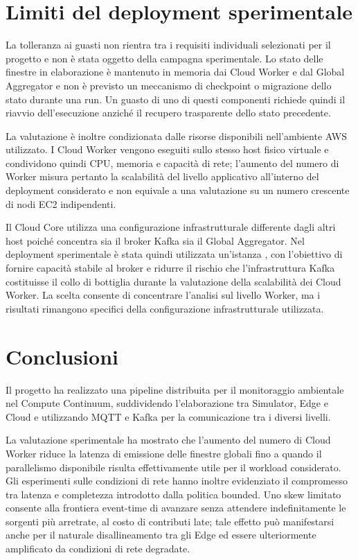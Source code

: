 \section{Limiti del deployment sperimentale}
\label{sec:limitazioni}

La tolleranza ai guasti non rientra tra i requisiti individuali selezionati
per il progetto e non è stata oggetto della campagna sperimentale. Lo stato
delle finestre in elaborazione è mantenuto in memoria dai Cloud Worker e dal
Global Aggregator e non è previsto un meccanismo di checkpoint o migrazione
dello stato durante una run. Un guasto di uno di questi componenti richiede
quindi il riavvio dell'esecuzione anziché il recupero trasparente dello stato
precedente.

La valutazione è inoltre condizionata dalle risorse disponibili
nell'ambiente AWS utilizzato. I Cloud Worker vengono eseguiti sullo stesso
host fisico virtuale e condividono quindi CPU, memoria e capacità di rete;
l'aumento del numero di Worker misura pertanto la scalabilità del livello
applicativo all'interno del deployment considerato e non equivale a una
valutazione su un numero crescente di nodi EC2 indipendenti.

Il Cloud Core utilizza una configurazione infrastrutturale differente dagli
altri host poiché concentra sia il broker Kafka sia il Global Aggregator.
Nel deployment sperimentale è stata quindi utilizzata un'istanza
, con l'obiettivo di fornire capacità stabile al broker e
ridurre il rischio che l'infrastruttura Kafka costituisse il collo di
bottiglia durante la valutazione della scalabilità dei Cloud Worker.
La scelta consente di concentrare l'analisi sul livello Worker, ma i risultati
rimangono specifici della configurazione infrastrutturale utilizzata.

\section{Conclusioni}
\label{sec:conclusioni}

Il progetto ha realizzato una pipeline distribuita per il monitoraggio
ambientale nel Compute Continuum, suddividendo l'elaborazione tra Simulator,
Edge e Cloud e utilizzando MQTT e Kafka per la comunicazione tra i diversi
livelli.

La valutazione sperimentale ha mostrato che l'aumento del numero di Cloud
Worker riduce la latenza di emissione delle finestre globali fino a quando il
parallelismo disponibile risulta effettivamente utile per il workload
considerato. Gli esperimenti sulle condizioni di rete hanno inoltre
evidenziato il compromesso tra latenza e completezza introdotto dalla politica
bounded. Uno skew limitato consente alla frontiera event-time di avanzare
senza attendere indefinitamente le sorgenti più arretrate, al costo di
contributi late; tale effetto può manifestarsi anche per il naturale
disallineamento tra gli Edge ed essere ulteriormente amplificato da condizioni
di rete degradate.

